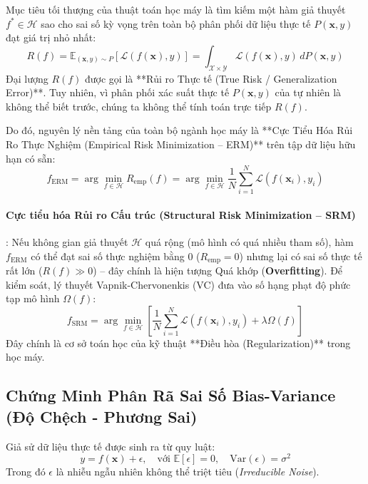 Mục tiêu tối thượng của thuật toán học máy là tìm kiếm một hàm giả thuyết $f^* \in \mathcal{H}$ sao cho sai số kỳ vọng trên toàn bộ phân phối dữ liệu thực tế $P(\mathbf{x}, y)$ đạt giá trị nhỏ nhất:
\begin{equation}
R(f) = \mathbb{E}_{(\mathbf{x}, y) \sim P}[\mathcal{L}(f(\mathbf{x}), y)] = \int_{\mathcal{X} \times \mathcal{Y}} \mathcal{L}(f(\mathbf{x}), y) \, dP(\mathbf{x}, y)
\label{eq:true-risk-def}
\end{equation}
Đại lượng $R(f)$ được gọi là **Rủi ro Thực tế (True Risk / Generalization Error)**. Tuy nhiên, vì phân phối xác suất thực tế $P(\mathbf{x}, y)$ của tự nhiên là không thể biết trước, chúng ta không thể tính toán trực tiếp $R(f)$. 

Do đó, nguyên lý nền tảng của toàn bộ ngành học máy là **Cực Tiểu Hóa Rủi Ro Thực Nghiệm (Empirical Risk Minimization -- ERM)** trên tập dữ liệu hữu hạn có sẵn:
\begin{equation}
f_{\text{ERM}} = \arg\min_{f \in \mathcal{H}} R_{\text{emp}}(f) = \arg\min_{f \in \mathcal{H}} \frac{1}{N} \sum_{i=1}^N \mathcal{L}(f(\mathbf{x}_i), y_i)
\label{eq:erm-def}
\end{equation}

\paragraph{Cực tiểu hóa Rủi ro Cấu trúc (Structural Risk Minimization -- SRM)}:
Nếu không gian giả thuyết $\mathcal{H}$ quá rộng (mô hình có quá nhiều tham số), hàm $f_{\text{ERM}}$ có thể đạt sai số thực nghiệm bằng 0 ($R_{\text{emp}} = 0$) nhưng lại có sai số thực tế rất lớn ($R(f) \gg 0$) -- đây chính là hiện tượng Quá khớp (\textbf{Overfitting}). Để kiểm soát, lý thuyết Vapnik-Chervonenkis (VC) đưa vào số hạng phạt độ phức tạp mô hình $\Omega(f)$:
\begin{equation}
f_{\text{SRM}} = \arg\min_{f \in \mathcal{H}} \left[ \frac{1}{N} \sum_{i=1}^N \mathcal{L}(f(\mathbf{x}_i), y_i) + \lambda \Omega(f) \right]
\end{equation}
Đây chính là cơ sở toán học của kỹ thuật **Điều hòa (Regularization)** trong học máy.

\subsection{Chứng Minh Phân Rã Sai Số Bias-Variance (Độ Chệch - Phương Sai)}
Giả sử dữ liệu thực tế được sinh ra từ quy luật:
\begin{equation}
y = f(\mathbf{x}) + \epsilon, \quad \text{với } \mathbb{E}[\epsilon] = 0, \quad \text{Var}(\epsilon) = \sigma^2
\end{equation}
Trong đó $\epsilon$ là nhiễu ngẫu nhiên không thể triệt tiêu (\textit{Irreducible Noise}).

